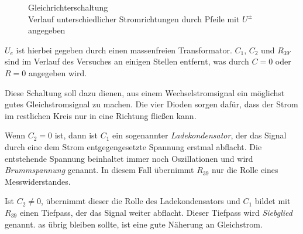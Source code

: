 \documentclass[10pt,a4paper]{scrartcl}
\begin{document}
\begin{figure}[!ht]
    \caption[Gleichrichterschaltung]
    {Gleichrichterschaltung\\
    Verlauf unterschiedlicher Stromrichtungen durch Pfeile mit $U^\pm$ angegeben}
    \label{fig:Gleichrichter}
\end{figure}

$U_e$ ist hierbei gegeben durch einen massenfreien Transformator.
$C_1$, $C_2$ und $R_{39'}$ sind im Verlauf des Versuches an einigen Stellen
entfernt, was durch $C=0$ oder $R=0$ angegeben wird.

Diese Schaltung soll dazu dienen, aus einem Wechselstromsignal ein möglichst
gutes Gleichstromsignal zu machen.
Die vier Dioden sorgen dafür, dass der Strom im restlichen Kreis nur in eine
Richtung fließen kann.

Wenn $C_2=0$ ist, dann ist $C_1$ ein sogenannter \emph{Ladekondensator},
der das Signal durch eine dem Strom entgegengesetzte Spannung erstmal abflacht.
Die entstehende Spannung beinhaltet immer noch Oszillationen und wird
\emph{Brummspannung} genannt.
In diesem Fall übernimmt $R_{39}$ nur die Rolle eines Messwiderstandes.

Ist $C_2\not=0$, übernimmt dieser die Rolle des Ladekondensators
und $C_1$ bildet mit $R_{39}$ einen Tiefpass, der das Signal weiter abflacht.
Dieser Tiefpass wird \emph{Siebglied} genannt.
as übrig bleiben sollte, ist eine gute Näherung an Gleichstrom.
\end{document}
